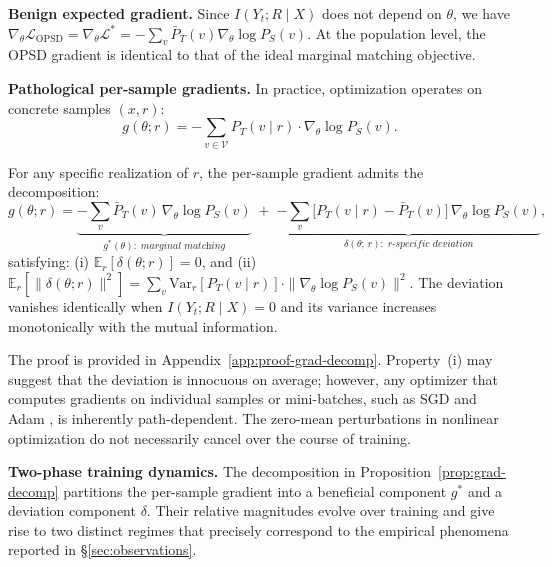 \documentclass[]{jingdong}
\begin{document}
\noindent \textbf{Benign expected gradient.}
Since $I(Y_t; R \mid X)$ does not depend on $\theta$, we have $\nabla_\theta \mathcal{L}_{\text{OPSD}} = \nabla_\theta \mathcal{L}^* = -\sum_{v} \bar{P}_T(v) \nabla_\theta \log P_S(v)$.
At the population level, the OPSD gradient is identical to that of the ideal marginal matching objective.

\noindent \textbf{Pathological per-sample gradients.}
In practice, optimization operates on concrete samples $(x, r)$:
\begin{equation}
    g(\theta; r) = -\sum_{v \in \mathcal{V}} P_T(v \mid r) \cdot \nabla_\theta \log P_S(v).
\end{equation}

\begin{proposition}
\label{prop:grad-decomp}
For any specific realization of $r$, the per-sample gradient admits the decomposition:
\begin{equation}
    g(\theta; r) = \underbrace{-\sum_{v} \bar{P}_T(v)\, \nabla_\theta \log P_S(v)}_{g^*(\theta):\; \textit{marginal matching}} \;+\; \underbrace{-\sum_{v} \bigl[P_T(v \mid r) - \bar{P}_T(v)\bigr]\, \nabla_\theta \log P_S(v)}_{\delta(\theta;\, r):\; r\textit{-specific deviation}},
    \label{eq:grad-decomp}
\end{equation}
satisfying: (i) $\mathbb{E}_{r}[\delta(\theta; r)] = 0$, and (ii) $\mathbb{E}_{r}[\|\delta(\theta; r)\|^2] = \sum_{v} \mathrm{Var}_{r}[P_T(v \mid r)] \cdot \|\nabla_\theta \log P_S(v)\|^2$. The deviation vanishes identically when $I(Y_t; R \mid X) = 0$ and its variance increases monotonically with the mutual information.
\end{proposition}

The proof is provided in Appendix~\ref{app:proof-grad-decomp}. Property~(i) may suggest that the deviation is innocuous on average; however, any optimizer that computes gradients on individual samples or mini-batches, such as SGD and Adam \citep{kingma2017adammethodstochasticoptimization}, is inherently path-dependent. The zero-mean perturbations in nonlinear optimization do not necessarily cancel over the course of training.

\noindent \textbf{Two-phase training dynamics.}
The decomposition in Proposition~\ref{prop:grad-decomp} partitions the per-sample gradient into a beneficial component $g^*$ and a deviation component $\delta$. Their relative magnitudes evolve over training and give rise to two distinct regimes that precisely correspond to the empirical phenomena reported in \S\ref{sec:observations}.
\end{document}
